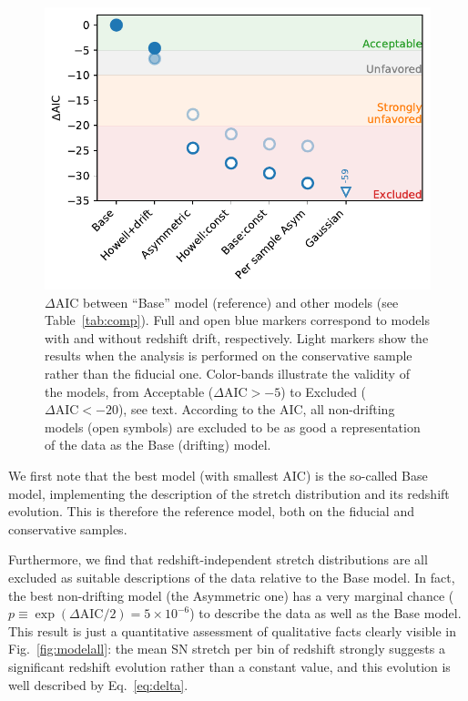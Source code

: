 \documentclass[]{aa} %
\newcommand{\nn}[1]{{\textcolor[rgb]{0.25, 0.50, 0}{#1}}}
\begin{document}
\begin{figure}
    \centering
    \includegraphics[width=\linewidth]{Article_figures/mod_comp.pdf}
    \caption{$\Delta$AIC between ``Base'' model (reference) and other models
        (see Table~\ref{tab:comp}). Full and open blue markers correspond to
        models with and without redshift drift, respectively. Light markers show
        the results when the analysis is performed on the conservative sample
        rather than the fiducial one.  Color-bands illustrate the validity of
        the models, from  Acceptable ($\Delta\mathrm{AIC} > -5$) to Excluded
        ($\Delta\mathrm{AIC} < -20$), see text. According to the AIC, all
    non-drifting models (open symbols) are excluded to be as good a representation
of the data as the Base (drifting) model.}
    \label{fig:mod_comp}
\end{figure}

We first note that the best model (with smallest AIC) is the so-called Base
model, implementing the \cite{rigault2018} description of the stretch
distribution and its redshift evolution. This is therefore the reference model, both on the fiducial and conservative samples. 

Furthermore, we find that redshift-independent stretch distributions are all
excluded as \nn{suitable} descriptions of the data relative to the Base model.
In fact, the best non-drifting model (the Asymmetric one) has a very marginal
chance ($p \equiv \exp\left(\Delta\mathrm{AIC}/2\right) = 5\times10^{-6}$) to
describe the data as well as the Base model. This result is just a quantitative
assessment of qualitative facts clearly visible in Fig.~\ref{fig:modelall}: the
mean SN stretch per bin of redshift strongly suggests a significant redshift
evolution rather than a constant value, and this evolution is well described by
Eq.~\ref{eq:delta}.
\end{document}
